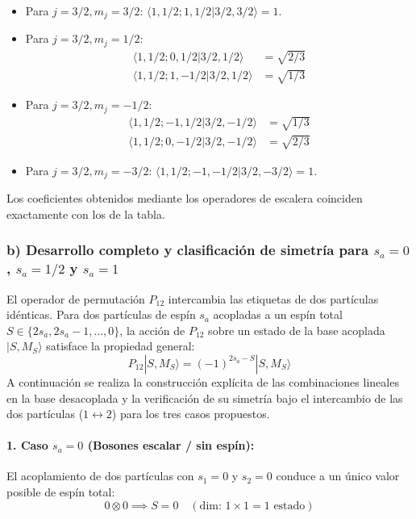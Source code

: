 \begin{problema}
\begin{itemize}
    \item Para $j = 3/2, m_j = 3/2$: $\langle 1, 1/2; 1, 1/2 | 3/2, 3/2 \rangle = 1$.
    \item Para $j = 3/2, m_j = 1/2$:
    \begin{align*}
        \langle 1, 1/2; 0, 1/2 | 3/2, 1/2 \rangle & = \sqrt{2/3}\\
        \langle 1, 1/2; 1, -1/2 | 3/2, 1/2 \rangle & = \sqrt{1/3}
    \end{align*}
    \item Para $j = 3/2, m_j = -1/2$:
    \begin{align*}
        \langle 1, 1/2; -1, 1/2 | 3/2, -1/2 \rangle & = \sqrt{1/3}\\
        \langle 1, 1/2; 0, -1/2 | 3/2, -1/2 \rangle & = \sqrt{2/3}
    \end{align*}
    \item Para $j = 3/2, m_j = -3/2$: $\langle 1, 1/2; -1, -1/2 | 3/2, -3/2 \rangle = 1$.
\end{itemize}
Los coeficientes obtenidos mediante los operadores de escalera coinciden exactamente con los de la tabla.


\subsubsection*{b) Desarrollo completo y clasificación de simetría para $s_a = 0$, $s_a = 1/2$ y $s_a = 1$}

El operador de permutación $P_{12}$ intercambia las etiquetas de dos partículas idénticas. Para dos partículas de espín $s_a$ acopladas a un espín total $S \in \{2s_a, 2s_a - 1, \dots, 0\}$, la acción de $P_{12}$ sobre un estado de la base acoplada $|S, M_S\rangle$ satisface la propiedad general:
\begin{equation*}
P_{12} |S, M_S\rangle = (-1)^{2s_a - S} |S, M_S\rangle
\end{equation*}
A continuación se realiza la construcción explícita de las combinaciones lineales en la base desacoplada y la verificación de su simetría bajo el intercambio de las dos partículas ($1 \leftrightarrow 2$) para los tres casos propuestos.

\paragraph{1. Caso $s_a = 0$ (Bosones escalar / sin espín):}
El acoplamiento de dos partículas con $s_1 = 0$ y $s_2 = 0$ conduce a un único valor posible de espín total:
\begin{equation*}
0 \otimes 0 \implies S = 0 \quad (\text{dim: } 1 \times 1 = 1 \text{ estado})
\end{equation*}


\end{problema}
